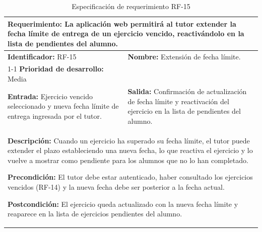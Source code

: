\begin{table}[H]
\caption{Especificación de requerimiento RF-15}
\centering
\renewcommand{\arraystretch}{1.3}
\setlength{\tabcolsep}{6pt}
\begin{tabular}{|p{7cm}|p{8cm}|}
\hline
\multicolumn{2}{|p{15cm}|}{\textbf{Requerimiento:} La aplicación web permitirá al tutor extender la fecha límite de entrega de un ejercicio vencido, reactivándolo en la lista de pendientes del alumno.} \\ \hline
\textbf{Identificador:} RF-15 &
\textbf{Nombre:} Extensión de fecha límite. \\ \cline{1-1}
\textbf{Prioridad de desarrollo:} Media &
\multicolumn{1}{p{8cm}|}{} \\ \hline
\textbf{Entrada:} Ejercicio vencido seleccionado y nueva fecha límite de entrega ingresada por el tutor. &
\textbf{Salida:} Confirmación de actualización de fecha límite y reactivación del ejercicio en la lista de pendientes del alumno. \\ \hline
\multicolumn{2}{|p{15cm}|}{
\textbf{Descripción:} Cuando un ejercicio ha superado su fecha límite, el tutor puede extender el plazo estableciendo una nueva fecha, lo que reactiva el ejercicio y lo vuelve a mostrar como pendiente para los alumnos que no lo han completado.

\vspace{0.2cm}
\textbf{Precondición:} El tutor debe estar autenticado, haber consultado los ejercicios vencidos (RF-14) y la nueva fecha debe ser posterior a la fecha actual.

\vspace{0.2cm}
\textbf{Postcondición:} El ejercicio queda actualizado con la nueva fecha límite y reaparece en la lista de ejercicios pendientes del alumno.
} \\ \hline
\end{tabular}
\label{tab:rf15}
\end{table}


